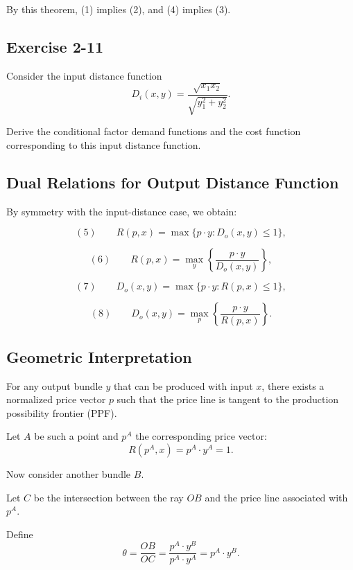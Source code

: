 By this theorem, (1) implies (2), and (4) implies (3).


\begin{tcolorbox}[breakable]

\subsection*{Exercise 2-11}

Consider the input distance function
\[
D_i(x,y)=\frac{\sqrt{x_1 x_2}}{\sqrt{y_1^2+y_2^2}}.
\]

Derive the conditional factor demand functions and the cost function
corresponding to this input distance function.


\end{tcolorbox}



\subsection*{Dual Relations for Output Distance Function}

By symmetry with the input-distance case, we obtain:

\[
(5)\qquad
R(p,x)
=
\max \{ p\cdot y : D_o(x,y)\le 1 \},
\]

\[
(6)\qquad
R(p,x)
=
\max_y \left\{ \frac{p\cdot y}{D_o(x,y)} \right\},
\]

\[
(7)\qquad
D_o(x,y)
=
\max \{ p\cdot y : R(p,x)\le 1 \},
\]

\[
(8)\qquad
D_o(x,y)
=
\max_p \left\{ \frac{p\cdot y}{R(p,x)} \right\}.
\]

\subsection*{Geometric Interpretation}

For any output bundle $y$ that can be produced with input $x$,
there exists a normalized price vector $p$ such that the price line
is tangent to the production possibility frontier (PPF).

Let $A$ be such a point and $p^A$ the corresponding price vector:
\[
R(p^A,x)=p^A \cdot y^A = 1.
\]

Now consider another bundle $B$.

Let $C$ be the intersection between the ray $OB$ and the price line
associated with $p^A$.

Define
\[
\theta
=
\frac{OB}{OC}
=
\frac{p^A \cdot y^B}{p^A \cdot y^A}
=
p^A \cdot y^B.
\]


